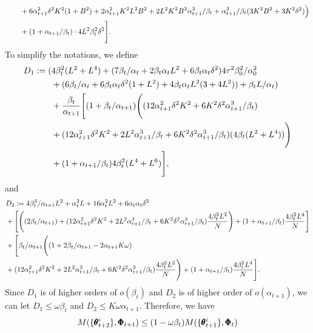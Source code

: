 \documentclass{article} %
\theoremstyle{plain}
\theoremstyle{definition}
\theoremstyle{remark}
\begin{document}
{\begin{align}
   &\qquad+6\alpha_{t+1}^2\delta^2K^2(1+B^2)+2\alpha_{t+1}^2K^2L^2B^2+2L^2K^2B^2\alpha_{t+1}^3/\beta_{t}+\alpha_{t+1}^3/\beta_{t}(3K^2B^2+3K^2\delta^2)\Big)\nonumber\allowdisplaybreaks\\
   &\qquad+(1+\alpha_{t+1}/\beta_{t})\cdot 4L^2\beta_{t}^2\delta^2\Bigg].
\end{align}
To simplify the notations, we define 
\begin{align}
    D_1&:=(4\beta_t^2(L^2+L^4)+(7\beta_t/\alpha_t+2\beta_t\alpha_tL^2+6\beta_t\alpha_t\delta^2)4\tau^2\beta_0^2/\alpha_0^2\nonumber\allowdisplaybreaks\\
    &\qquad+(6\beta_t/\alpha_t+6\beta_t\alpha_t\delta^2(1+L^2) +4\beta_t\alpha_tL^2(3+4L^2))+\beta_tL/\alpha_t)\nonumber\allowdisplaybreaks\\
    &\qquad+\frac{\beta_t}{\alpha_{t+1}}\Bigg[(1+\beta_{t}/\alpha_{t+1})\Bigg((12\alpha_{t+1}^2\delta^2K^2+6K^2\delta^2\alpha_{t+1}^3/\beta_{t})\nonumber\allowdisplaybreaks\\
    &\qquad +(12\alpha_{t+1}^2\delta^2K^2+2L^2\alpha_{t+1}^3/\beta_{t}+6K^2\delta^2\alpha_{t+1}^3/\beta_{t})(4\beta_{t}(L^2+L^4))\Bigg)\nonumber\allowdisplaybreaks\\
   &\qquad+(1+\alpha_{t+1}/\beta_{t})4\beta_{t}^2(L^4+L^6)\Bigg],
\end{align}
 and 
 \begin{align}
     &D_2:=4\beta_t^3/\alpha_{t+1}L^2+\alpha_t^2L+16\alpha_t^2 L^2+6\alpha_t\alpha_t \delta^2\nonumber\allowdisplaybreaks\\
    &+\Bigg[\Bigg((2\beta_{t}/\alpha_{t+1})+(12\alpha_{t+1}^2\delta^2K^2+2L^2\alpha_{t+1}^3/\beta_{t}+6K^2\delta^2\alpha_{t+1}^3/\beta_{t})\frac{4\beta_{t}^2L^2}{N}\Bigg)+(1+\alpha_{t+1}/\beta_{t})\frac{4\beta_{t}^2L^4}{N}\Bigg]\nonumber\allowdisplaybreaks\\
    &+\Bigg[\beta_{t}/\alpha_{t+1}\Bigg((1+2\beta_{t}/\alpha_{t+1}-2\alpha_{t+1}K\omega)\nonumber\allowdisplaybreaks\\
    &+(12\alpha_{t+1}^2\delta^2K^2+2L^2\alpha_{t+1}^3/\beta_{t}+6K^2\delta^2\alpha_{t+1}^3/\beta_{t})\frac{4\beta_{t}^2L^2}{N}\Bigg)+(1+\alpha_{t+1}/\beta_{t})\frac{4\beta_{t}^2L^4}{N}\Bigg].
 \end{align}
Since $D_1$ is of higher orders of $o(\beta_t)$ and $D_2$ is of higher order of $o(\alpha_{t+1})$, we can let $D_1\leq \omega\beta_t$ and $D_2\leq K\omega\alpha_{t+1}$. Therefore, we have
\begin{align}
&M(\{\pmb{\theta}_{t+2}^i\}, \pmb{\Phi}_{t+1})\leq (1-\omega\beta_t)M(\{\pmb{\theta}_{t+1}^i\}, \pmb{\Phi}_{t})\nonumber\allowdisplaybreaks\\

\end{align}}
\end{document}
